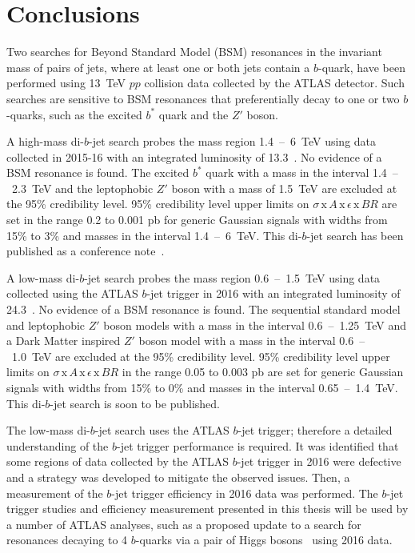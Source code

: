 \chapter{Conclusions}
\label{sec:conc}

Two searches for Beyond Standard Model (BSM) resonances in the invariant mass of pairs of jets,
where at least one or both jets contain a $b$-quark,
have been performed using 13~TeV $pp$ collision data collected by the ATLAS detector.
Such searches are sensitive to BSM resonances that preferentially decay to one or two $b$-quarks, such as the excited $b^*$ quark and the $Z'$ boson.


A high-mass di-$b$-jet search probes the mass region 1.4~--~6~TeV
using data collected in 2015-16 with an integrated luminosity of 13.3~\ifb{}.
No evidence of a BSM resonance is found.
The excited $b^*$ quark with a mass in the interval 1.4~--~2.3~TeV
and the leptophobic $Z'$ boson with a mass of 1.5~TeV are excluded at the 95\% credibility level.
95\% credibility level upper limits on $\sigma\,\text{x}\,\mathit{A}\,\text{x}\,\epsilon\,\text{x}\,\mathit{BR}$
are set in the range 0.2 to 0.001 pb for generic Gaussian signals with widths from 15\% to 3\% and masses in the interval 1.4~--~6~TeV.
This di-$b$-jet search has been published as a conference note~\cite{dibjet-ichep_conf}.

A low-mass di-$b$-jet search probes the mass region 0.6~--~1.5~TeV
using data collected using the ATLAS $b$-jet trigger in 2016 with an integrated luminosity of 24.3~\ifb{}.
No evidence of a BSM resonance is found.
The sequential standard model and leptophobic $Z'$  boson models with a mass in the interval 0.6~--~1.25~TeV
and a Dark Matter inspired $Z'$ boson model with a mass in the interval 0.6~--~1.0~TeV are excluded at the 95\% credibility level.
95\% credibility level upper limits on $\sigma\,\text{x}\,\mathit{A}\,\text{x}\,\epsilon\,\text{x}\,\mathit{BR}$ in the range 0.05 to 0.003 pb
are set for generic Gaussian signals with widths from 15\% to 0\% and masses in the interval 0.65~--~1.4~TeV.
This di-$b$-jet search is soon to be published.

The low-mass di-$b$-jet search uses the ATLAS $b$-jet trigger; therefore a detailed understanding of the $b$-jet trigger performance is required.
It was identified that some regions of data collected by the ATLAS $b$-jet trigger in 2016 were defective
and a strategy was developed to mitigate the observed issues.
Then, a measurement of the $b$-jet trigger efficiency in 2016 data was performed.
The $b$-jet trigger studies and efficiency measurement presented in this thesis will be used by a number of ATLAS analyses,
such as a proposed update to a search for resonances decaying to 4 $b$-quarks via a pair of Higgs bosons~\cite{trig-H4b} using 2016 data.

